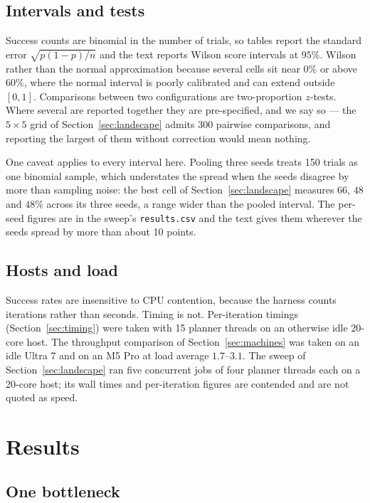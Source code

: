 \documentclass[conference]{IEEEtran}
\begin{document}
\subsection{Intervals and tests}
\label{sec:stats}

Success counts are binomial in the number of trials, so tables report the
standard error $\sqrt{p(1-p)/n}$ and the text reports Wilson score intervals at
$95\%$. Wilson rather than the normal approximation because several cells sit
near $0\%$ or above $60\%$, where the normal interval is poorly calibrated and
can extend outside $[0,1]$. Comparisons between two configurations are
two-proportion $z$-tests. Where several are reported together they are
pre-specified, and we say so --- the $5\times5$ grid of
Section~\ref{sec:landscape} admits 300 pairwise comparisons, and reporting the
largest of them without correction would mean nothing.

One caveat applies to every interval here. Pooling three seeds treats 150
trials as one binomial sample, which understates the spread when the seeds
disagree by more than sampling noise: the best cell of
Section~\ref{sec:landscape} measures $66$, $48$ and $48\%$ across its three
seeds, a range wider than the pooled interval. The per-seed figures are in the
sweep's \texttt{results.csv} and the text gives them wherever the seeds spread
by more than about 10 points.

\subsection{Hosts and load}

Success rates are insensitive to CPU contention, because the harness counts
iterations rather than seconds. Timing is not. Per-iteration timings
(Section~\ref{sec:timing}) were taken with 15 planner threads on an otherwise
idle 20-core host. The throughput comparison of Section~\ref{sec:machines} was
taken on an idle Ultra 7 and on an M5 Pro at load average $1.7$--$3.1$. The
sweep of Section~\ref{sec:landscape} ran five concurrent jobs of four planner
threads each on a 20-core host; its wall times and per-iteration figures are
contended and are not quoted as speed.

\section{Results}

\subsection{One bottleneck}
\label{sec:planners-one}
\end{document}
